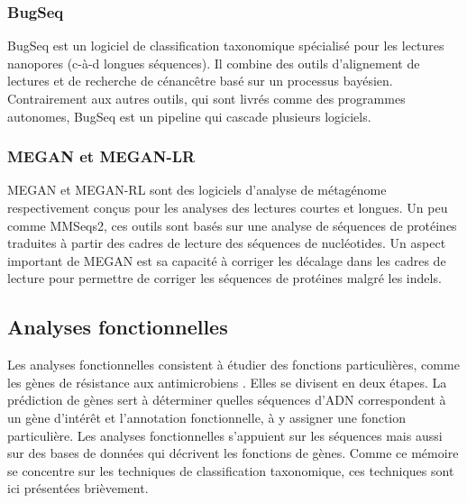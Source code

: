 \subsubsection{BugSeq}
BugSeq \cite{bugseq} est un logiciel de classification taxonomique spécialisé pour les lectures
nanopores (c-à-d longues séquences). Il combine des outils d'alignement de lectures et de recherche
de cénancêtre basé sur un processus bayésien. Contrairement aux autres outils, qui sont livrés
comme des programmes autonomes, BugSeq est un pipeline qui cascade plusieurs logiciels.

\subsubsection{MEGAN et MEGAN-LR}
MEGAN et MEGAN-RL \cite{meganlr} sont des logiciels d'analyse de métagénome respectivement conçus
pour les analyses des lectures courtes et longues. Un peu comme MMSeqs2, ces outils sont basés sur
une analyse de séquences de protéines traduites à partir des cadres de lecture des séquences de
nucléotides. Un aspect important de MEGAN est sa capacité à corriger les décalage dans les cadres
de lecture pour permettre de corriger les séquences de protéines malgré les indels.

\subsection{Analyses fonctionnelles}
Les analyses fonctionnelles consistent à étudier des fonctions particulières, comme les gènes de
résistance aux antimicrobiens \cite{Navgire2022}. Elles se divisent en deux étapes. La prédiction de
gènes sert à déterminer quelles séquences d'ADN correspondent à un gène d'intérêt et l'annotation
fonctionnelle, à y assigner une fonction particulière. Les analyses fonctionnelles s'appuient sur
les séquences mais aussi sur des bases de données qui décrivent les fonctions de gènes. Comme ce
mémoire se concentre sur les techniques de classification taxonomique, ces techniques sont ici
présentées brièvement.

